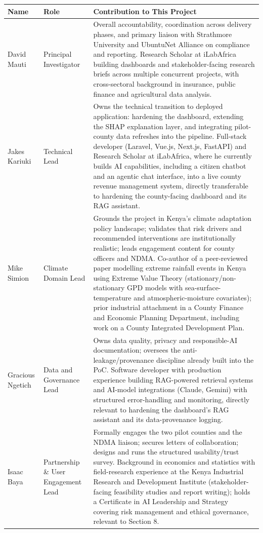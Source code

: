 \documentclass[12pt,a4paper]{article}
\begin{document}
\begin{center}
\small
\begin{tabular}{@{}p{2.3cm}p{2.7cm}p{9.3cm}@{}}
\toprule
\textbf{Name} & \textbf{Role} & \textbf{Contribution to This Project} \\
\midrule
David Mauti & Principal Investigator &
Overall accountability, coordination across delivery phases, and primary liaison with Strathmore University and UbuntuNet Alliance on compliance and reporting. Research Scholar at iLabAfrica building dashboards and stakeholder-facing research briefs across multiple concurrent projects, with cross-sectoral background in insurance, public finance and agricultural data analysis. \\
\addlinespace
Jakes Kariuki & Technical Lead &
Owns the technical transition to deployed application: hardening the dashboard, extending the SHAP explanation layer, and integrating pilot-county data refreshes into the pipeline. Full-stack developer (Laravel, Vue.js, Next.js, FastAPI) and Research Scholar at iLabAfrica, where he currently builds AI capabilities, including a citizen chatbot and an agentic chat interface, into a live county revenue management system, directly transferable to hardening the county-facing dashboard and its RAG assistant. \\
\addlinespace
Mike Simion & Climate Domain Lead &
Grounds the project in Kenya's climate adaptation policy landscape; validates that risk drivers and recommended interventions are institutionally realistic; leads engagement content for county officers and NDMA. Co-author of a peer-reviewed paper modelling extreme rainfall events in Kenya using Extreme Value Theory (stationary/non-stationary GPD models with sea-surface-temperature and atmospheric-moisture covariates); prior industrial attachment in a County Finance and Economic Planning Department, including work on a County Integrated Development Plan. \\
\addlinespace
Gracious Ngetich & Data and Governance Lead &
Owns data quality, privacy and responsible-AI documentation; oversees the anti-leakage/provenance discipline already built into the PoC. Software developer with production experience building RAG-powered retrieval systems and AI-model integrations (Claude, Gemini) with structured error-handling and monitoring, directly relevant to hardening the dashboard's RAG assistant and its data-provenance logging. \\
\addlinespace
Isaac Baya & Partnership \& User Engagement Lead &
Formally engages the two pilot counties and the NDMA liaison; secures letters of collaboration; designs and runs the structured usability/trust survey. Background in economics and statistics with field-research experience at the Kenya Industrial Research and Development Institute (stakeholder-facing feasibility studies and report writing); holds a Certificate in AI Leadership and Strategy covering risk management and ethical governance, relevant to Section 8. \\

\end{tabular}
\end{center}
\end{document}
